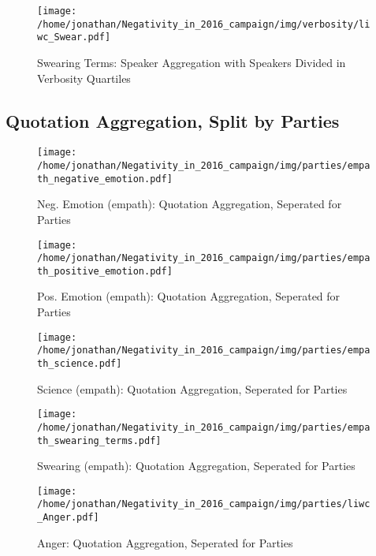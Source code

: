 \begin{figure}[h]\centering
	\texttt{[image: /home/jonathan/Negativity\_in\_2016\_campaign/img/verbosity/liwc\_Swear.pdf]}
	\caption{Swearing Terms: Speaker Aggregation with Speakers Divided in Verbosity Quartiles}
	\label{fig: verbosity_Swearing Terms}
\end{figure}

\clearpage
\pagebreak

\subsection{Quotation Aggregation, Split by Parties}

\begin{figure}[h]\centering
	\texttt{[image: /home/jonathan/Negativity\_in\_2016\_campaign/img/parties/empath\_negative\_emotion.pdf]}
	\caption{Neg. Emotion (empath): Quotation Aggregation, Seperated for Parties}
	\label{fig: parties_Neg. Emotion (empath)}
\end{figure}

\begin{figure}[h]\centering
	\texttt{[image: /home/jonathan/Negativity\_in\_2016\_campaign/img/parties/empath\_positive\_emotion.pdf]}
	\caption{Pos. Emotion (empath): Quotation Aggregation, Seperated for Parties}
	\label{fig: parties_Pos. Emotion (empath)}
\end{figure}

\begin{figure}[h]\centering
	\texttt{[image: /home/jonathan/Negativity\_in\_2016\_campaign/img/parties/empath\_science.pdf]}
	\caption{Science (empath): Quotation Aggregation, Seperated for Parties}
	\label{fig: parties_Science (empath)}
\end{figure}

\begin{figure}[h]\centering
	\texttt{[image: /home/jonathan/Negativity\_in\_2016\_campaign/img/parties/empath\_swearing\_terms.pdf]}
	\caption{Swearing (empath): Quotation Aggregation, Seperated for Parties}
	\label{fig: parties_Swearing (empath)}
\end{figure}

\begin{figure}[h]\centering
	\texttt{[image: /home/jonathan/Negativity\_in\_2016\_campaign/img/parties/liwc\_Anger.pdf]}
	\caption{Anger: Quotation Aggregation, Seperated for Parties}
	\label{fig: parties_Anger}
\end{figure}

